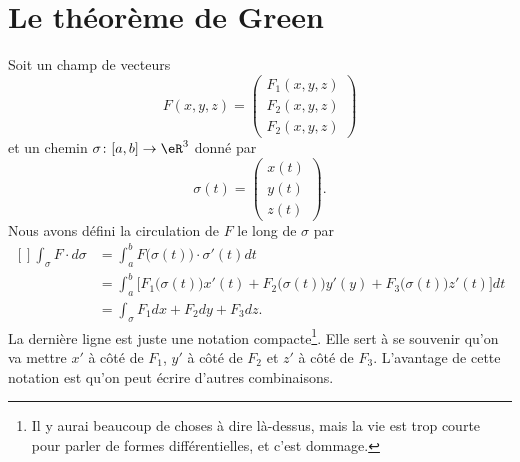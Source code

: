 
\section{Le théorème de Green}

Soit un champ de vecteurs
\begin{equation}
	F(x,y,z)=\begin{pmatrix}
		F_1(x,y,z) \\
		F_2(x,y,z) \\
		F_2(x,y,z)
	\end{pmatrix}
\end{equation}
et un chemin $\sigma\colon \mathopen[ a , b \mathclose]\to \eR^3$ donné par
\begin{equation}
	\sigma(t)=\begin{pmatrix}
		x(t) \\
		y(t) \\
		z(t)
	\end{pmatrix}.
\end{equation}
Nous avons défini la circulation de $F$ le long de $\sigma$ par
\begin{equation}
	\begin{aligned}[]
		\int_{\sigma}F\cdot d\sigma & =\int_a^bF\big( \sigma(t) \big)\cdot\sigma'(t)dt                                                                \\
		                            & =\int_a^b\Big[ F_1\big( \sigma(t) \big)x'(t)+F_2\big( \sigma(t) \big)y'(y)+F_3\big( \sigma(t) \big)z'(t)\Big]dt \\
		                            & =\int_{\sigma} F_1dx +F_2dy+F_3dz.
	\end{aligned}
\end{equation}
La dernière ligne est juste une notation compacte\footnote{Il y aurai beaucoup de choses à dire là-dessus, mais la vie est trop courte pour parler de formes différentielles, et c'est dommage.}. Elle sert à se souvenir qu'on va mettre $x'$ à côté de $F_1$, $y'$ à côté de $F_2$ et $z'$ à côté de $F_3$. L'avantage de cette notation est qu'on peut écrire d'autres combinaisons.

